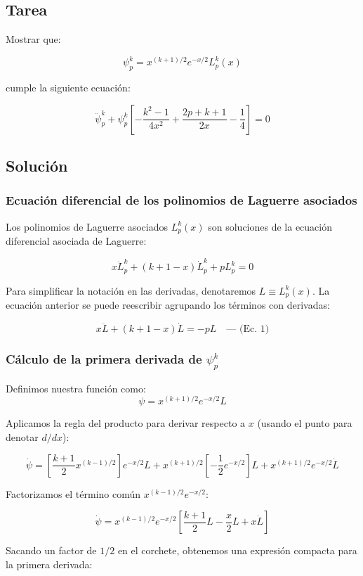 \documentclass[a4paper]{article}
\begin{document}
\subsection{Tarea}

Mostrar que:

\[
\psi_p^k = x^{(k+1)/2}e^{-x/2}L_p^k(x)
\]

cumple la siguiente ecuación:

\[
\ddot{\psi}_p^k + \psi_p^k \left[-\frac{k^2-1}{4x^2} + \frac{2p+k+1}{2x} - \frac{1}{4}\right] = 0
\]

\subsection{Solución}
\subsubsection{Ecuación diferencial de los polinomios de Laguerre asociados}

Los polinomios de Laguerre asociados $L_p^k(x)$ son soluciones de la ecuación diferencial asociada de Laguerre:

\[
x \ddot{L}_p^k + (k+1-x)\dot{L}_p^k + p L_p^k = 0
\]

Para simplificar la notación en las derivadas, denotaremos $L \equiv L_p^k(x)$. La ecuación anterior se puede reescribir agrupando los términos con derivadas:

\[
x \ddot{L} + (k+1-x)\dot{L} = -p L \quad \text{--- (Ec. 1)}
\]

\subsubsection[Cálculo de la primera derivada de psi]{Cálculo de la primera derivada de $\psi_p^k$}

Definimos nuestra función como:
\[
\psi = x^{(k+1)/2} e^{-x/2} L
\]

Aplicamos la regla del producto para derivar respecto a $x$ (usando el punto para denotar $d/dx$):

\[
\dot{\psi} = \left[ \frac{k+1}{2} x^{(k-1)/2} \right] e^{-x/2} L + x^{(k+1)/2} \left[ -\frac{1}{2} e^{-x/2} \right] L + x^{(k+1)/2} e^{-x/2} \dot{L}
\]

Factorizamos el término común $x^{(k-1)/2} e^{-x/2}$:

\[
\dot{\psi} = x^{(k-1)/2} e^{-x/2} \left[ \frac{k+1}{2} L - \frac{x}{2} L + x \dot{L} \right]
\]

Sacando un factor de $1/2$ en el corchete, obtenemos una expresión compacta para la primera derivada:
\end{document}

